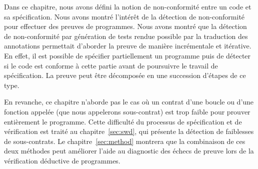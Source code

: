 Dans ce chapitre, nous avons défini la notion de non-conformité entre un code
et sa spécification.
Nous avons montré l'intérêt de la détection de non-conformité pour effectuer
des preuves de programmes.
Nous avons montré que la détection de non-conformité par génération de tests
rendue possible par la traduction des annotations permettait d'aborder la preuve
de manière incrémentale et itérative.
En effet, il est possible de spécifier partiellement un programme puis de
détecter si le code est conforme à cette partie avant de poursuivre le travail
de spécification.
La preuve peut être décomposée en une succession d'étapes de ce type.

En revanche, ce chapitre n'aborde pas le cas où un contrat d'une boucle ou
d'une fonction appelée (que nous appelerons sous-contrat) est trop faible pour
prouver entièrement le programme.
Cette difficulté du processus de spécification et de vérification est traité au
chapitre~\ref{sec:swd}, qui présente la détection de faiblesses de
sous-contrats.
Le chapitre~\ref{sec:method} montrera que la combinaison de ces deux méthodes
peut améliorer l'aide au diagnostic des échecs de preuve lors de la vérification
déductive de programmes.
